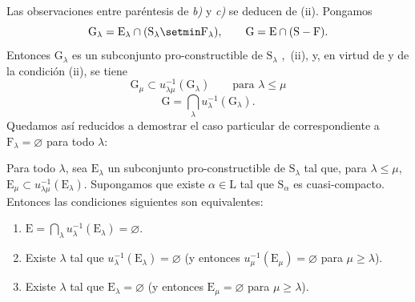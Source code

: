 \begin{theorem}[8.3.2]
\begin{enumerate}[label=\emph{\alph*)}]
\end{enumerate}
Las observaciones entre paréntesis de \emph{b)} y \emph{c)} se deducen de (ii).
Pongamos
\[
  \mathrm{G}_\lambda=\mathrm{E}_\lambda\cap(\mathrm{S}_\lambda\setmin \mathrm{F}_\lambda),\qquad \mathrm{G}=\mathrm{E}\cap(\mathrm{S}-\mathrm{F}).
\]
Entonces $\mathrm{G}_\lambda$ es un subconjunto pro-constructible de $\mathrm{S}_\lambda$ ,~(ii), y, en virtud de  y de la condición (ii), se tiene
\[
  \mathrm{G}_\mu\subset u_{\lambda\mu}^{-1}(\mathrm{G}_\lambda)\qquad\text{para }\lambda\leqslant\mu
\]
\[
  \mathrm{G}=\bigcap_\lambda u_\lambda^{-1}(\mathrm{G}_\lambda).
\]
Quedamos así reducidos a demostrar el caso particular de  correspondiente a $\mathrm{F}_\lambda=\varnothing$ para todo $\lambda$:
\end{theorem}

\begin{corollary}[8.3.3]
\label{IV.8.3.3}
Para todo $\lambda$, sea $\mathrm{E}_\lambda$ un subconjunto pro-constructible de $\mathrm{S}_\lambda$ tal que, para $\lambda\leqslant\mu$, $\mathrm{E}_\mu\subset u_{\lambda\mu}^{-1}(\mathrm{E}_\lambda)$.
Supongamos que existe $\alpha\in\mathrm{L}$ tal que $\mathrm{S}_\alpha$ es cuasi-compacto.
Entonces las condiciones siguientes son equivalentes:
\begin{enumerate}[label=\emph{\alph*)}]
   \item $\mathrm{E}=\bigcap_\lambda u_\lambda^{-1}(\mathrm{E}_\lambda)=\varnothing$.
   \item Existe $\lambda$ tal que $u_\lambda^{-1}(\mathrm{E}_\lambda)=\varnothing$ (y entonces $u_\mu^{-1}(\mathrm{E}_\mu)=\varnothing$ para $\mu\geqslant\lambda$).
   \item Existe $\lambda$ tal que $\mathrm{E}_\lambda=\varnothing$ (y entonces $\mathrm{E}_\mu=\varnothing$ para $\mu\geqslant\lambda$).
\end{enumerate}
\end{corollary}

